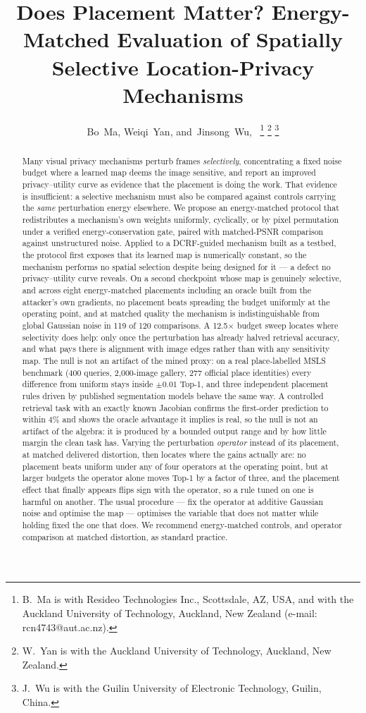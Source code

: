\documentclass[10pt,journal]{IEEEtran}
\title{Does Placement Matter? Energy-Matched Evaluation of Spatially Selective Location-Privacy Mechanisms}
\author{Bo~Ma,
        Weiqi~Yan,
        and~Jinsong~Wu,~\IEEEmembership{Senior~Member,~IEEE}
\thanks{B.~Ma is with Resideo Technologies Inc., Scottsdale, AZ, USA, and with
the Auckland University of Technology, Auckland, New Zealand (e-mail:
rcn4743@aut.ac.nz).}
\thanks{W.~Yan is with the Auckland University of Technology, Auckland, New
Zealand.}
\thanks{J.~Wu is with the Guilin University of Electronic Technology, Guilin,
China.}}
\begin{document}
\maketitle
\begin{abstract}
Many visual privacy mechanisms perturb frames \emph{selectively}, concentrating a fixed noise budget where a learned map deems the image sensitive, and report an improved privacy--utility curve as evidence that the placement is doing the work. That evidence is insufficient: a selective mechanism must also be compared against controls carrying the \emph{same} perturbation energy elsewhere. We propose an energy-matched protocol that redistributes a mechanism's own weights uniformly, cyclically, or by pixel permutation under a verified energy-conservation gate, paired with matched-PSNR comparison against unstructured noise. Applied to a DCRF-guided mechanism built as a testbed, the protocol first exposes that its learned map is numerically constant, so the mechanism performs no spatial selection despite being designed for it --- a defect no privacy--utility curve reveals. On a second checkpoint whose map is genuinely selective, and across eight energy-matched placements including an oracle built from the attacker's own gradients, no placement beats spreading the budget uniformly at the operating point, and at matched quality the mechanism is indistinguishable from global Gaussian noise in 119 of 120 comparisons. A 12.5$\times$ budget sweep locates where selectivity does help: only once the perturbation has already halved retrieval accuracy, and what pays there is alignment with image edges rather than with any sensitivity map. The null is not an artifact of the mined proxy: on a real place-labelled MSLS benchmark (400 queries, 2,000-image gallery, 277 official place identities) every difference from uniform stays inside $\pm0.01$ Top-1, and three independent placement rules driven by published segmentation models behave the same way. A controlled retrieval task with an exactly known Jacobian confirms the first-order prediction to within 4\% and shows the oracle advantage it implies is real, so the null is not an artifact of the algebra: it is produced by a bounded output range and by how little margin the clean task has. Varying the perturbation \emph{operator} instead of its placement, at matched delivered distortion, then locates where the gains actually are: no placement beats uniform under any of four operators at the operating point, but at larger budgets the operator alone moves Top-1 by a factor of three, and the placement effect that finally appears flips sign with the operator, so a rule tuned on one is harmful on another. The usual procedure --- fix the operator at additive Gaussian noise and optimise the map --- optimises the variable that does not matter while holding fixed the one that does. We recommend energy-matched controls, and operator comparison at matched distortion, as standard practice.
\end{abstract}
\end{document}
